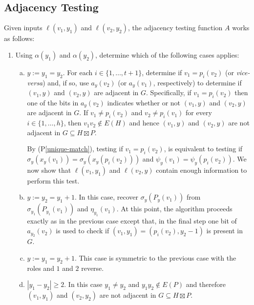 \documentclass{patmorin}
\newcommand{\pref}[1]{(P\ref{#1})}
\begin{document}
\subsection{Adjacency Testing}

Given inputs $\ell(v_1,y_1)$ and $\ell(v_2,y_2)$, the adjacency testing function $A$ works as follows:
\begin{enumerate}
    \item Using $\alpha(y_1)$ and $\alpha(y_2)$, determine which of the following cases applies:
    \begin{enumerate}[(a)]
        \item $y:=y_1=y_2$.  For each $i\in\{1,\ldots,t+1\}$, determine if $v_1=p_i(v_2)$ (or \textit{vice-versa}) and, if so, use $a_y(v_2)$ (or $a_y(v_1)$, respectively) to determine if $(v_1,y)$ and $(v_2,y)$ are adjacent in $G$. Specifically, if $v_1=p_i(v_2)$ then one of the bits in $a_y(v_2)$ indicates whether or not $(v_1,y)$ and $(v_2,y)$ are adjacent in $G$. If $v_1\neq p_i(v_2)$ and $v_2\neq p_i(v_1)$ for every $i\in\{1,\ldots,h\}$, then $v_1v_2\not\in E(H)$ and hence $(v_1,y)$ and $(v_2,y)$ are not adjacent in $G\subseteq H\boxtimes P$.

        By \pref{unique-match}, testing if $v_1=p_i(v_2)$, is equivalent to testing if $\sigma_y(x_y(v_1))=\sigma_y(x_y(p_i(v_2)))$ and $\psi_y(v_1)=\psi_y(p_i(v_2))$. We now show that $\ell(v_1,y_1)$ and $\ell(v_2,y)$ contain enough information to perform this test.
        \item $y:=y_2=y_1+1$.  In this case, recover $\sigma_y(P_y(v_1))$ from $\sigma_{y_1}(P_{y_1}(v_1))$ and $\eta_{y_1}(v_1)$.  At this point, the algorithm proceeds exactly as in the previous case except that, in the final step one bit of $a_{y_2}(v_2)$ is used to check if $(v_1,y_1)=(p_i(v_2),y_2-1)$ is present in $G$.

        \item $y:=y_1=y_{2}+1$. This case is symmetric to the previous case with the roles and $1$ and $2$ reverse.

        \item $|y_1-y_2|\ge 2$.  In this case $y_1\neq y_2$ and $y_1y_2\not\in E(P)$ and therefore $(v_1,y_1)$ and $(v_2,y_2)$ are not adjacent in $G\subseteq H\boxtimes P$.
    \end{enumerate}
\end{enumerate}
\end{document}
